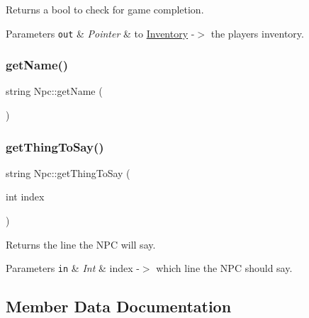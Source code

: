 Returns a bool to check for game completion. 


\begin{DoxyParams}[1]{Parameters}
\mbox{\tt out}  & {\em Pointer} & to \mbox{\hyperlink{class_inventory}{Inventory}} -\/$>$ the players inventory. \\
\hline
\end{DoxyParams}
\mbox{\label{class_npc_a93f51feaa226543914f1cc0bc4cef1f6}} 
\subsubsection{\texorpdfstring{get\+Name()}{getName()}}
{\footnotesize\ttfamily string Npc\+::get\+Name (\begin{DoxyParamCaption}{ }\end{DoxyParamCaption})\hspace{0.3cm}{\ttfamily [virtual]}}

\mbox{\label{class_npc_a4dcac5b79963771805597411e819cd11}} 
\subsubsection{\texorpdfstring{get\+Thing\+To\+Say()}{getThingToSay()}}
{\footnotesize\ttfamily string Npc\+::get\+Thing\+To\+Say (\begin{DoxyParamCaption}\item[{int}]{index }\end{DoxyParamCaption})\hspace{0.3cm}{\ttfamily [virtual]}}



Returns the line the N\+PC will say. 


\begin{DoxyParams}[1]{Parameters}
\mbox{\tt in}  & {\em Int} & index -\/$>$ which line the N\+PC should say. \\
\hline
\end{DoxyParams}


\subsection{Member Data Documentation}
\mbox{\label{class_npc_a4136960f515b8318c602e8eb75b6163a}} 
